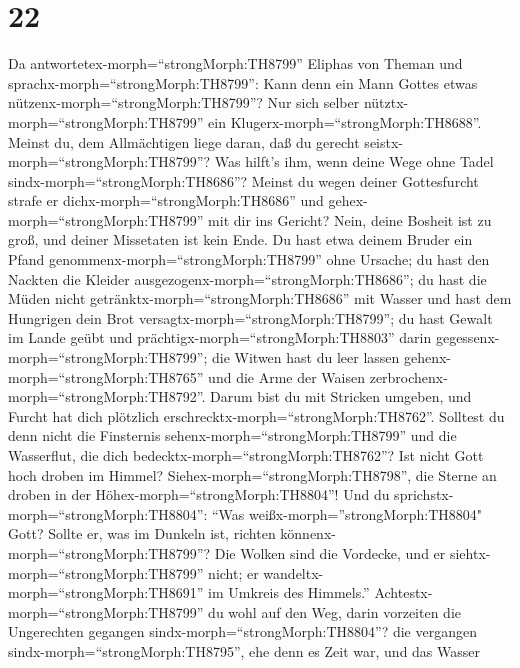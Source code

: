 \hypertarget{section-21}{%
\section{22}\label{section-21}}

 Da antwortetex-morph=``strongMorph:TH8799'' Eliphas von
Theman und sprachx-morph=``strongMorph:TH8799'':  Kann denn
ein Mann Gottes etwas nützenx-morph=``strongMorph:TH8799''? Nur sich
selber nütztx-morph=``strongMorph:TH8799'' ein
Klugerx-morph=``strongMorph:TH8688''.  Meinst du, dem
Allmächtigen liege daran, daß du gerecht
seistx-morph=``strongMorph:TH8799''? Was hilft's ihm, wenn deine Wege
ohne Tadel sindx-morph=``strongMorph:TH8686''?  Meinst du
wegen deiner Gottesfurcht strafe er dichx-morph=``strongMorph:TH8686''
und gehex-morph=``strongMorph:TH8799'' mit dir ins Gericht? 
Nein, deine Bosheit ist zu groß, und deiner Missetaten ist kein Ende.
 Du hast etwa deinem Bruder ein Pfand
genommenx-morph=``strongMorph:TH8799'' ohne Ursache; du hast den Nackten
die Kleider ausgezogenx-morph=``strongMorph:TH8686'';  du
hast die Müden nicht getränktx-morph=``strongMorph:TH8686'' mit Wasser
und hast dem Hungrigen dein Brot versagtx-morph=``strongMorph:TH8799'';
 du hast Gewalt im Lande geübt und
prächtigx-morph=``strongMorph:TH8803'' darin
gegessenx-morph=``strongMorph:TH8799'';  die Witwen hast du
leer lassen gehenx-morph=``strongMorph:TH8765'' und die Arme der Waisen
zerbrochenx-morph=``strongMorph:TH8792''.  Darum bist du
mit Stricken umgeben, und Furcht hat dich plötzlich
erschrecktx-morph=``strongMorph:TH8762''.  Solltest du denn
nicht die Finsternis sehenx-morph=``strongMorph:TH8799'' und die
Wasserflut, die dich bedecktx-morph=``strongMorph:TH8762''?
 Ist nicht Gott hoch droben im Himmel?
Siehex-morph=``strongMorph:TH8798'', die Sterne an droben in der
Höhex-morph=``strongMorph:TH8804''!  Und du
sprichstx-morph=``strongMorph:TH8804'': ``Was
weißx-morph=''strongMorph:TH8804" Gott? Sollte er, was im Dunkeln ist,
richten könnenx-morph=``strongMorph:TH8799''?  Die Wolken
sind die Vordecke, und er siehtx-morph=``strongMorph:TH8799'' nicht; er
wandeltx-morph=``strongMorph:TH8691'' im Umkreis des Himmels.''
 Achtestx-morph=``strongMorph:TH8799'' du wohl auf den Weg,
darin vorzeiten die Ungerechten gegangen
sindx-morph=``strongMorph:TH8804''?  die vergangen
sindx-morph=``strongMorph:TH8795'', ehe denn es Zeit war, und das Wasser
